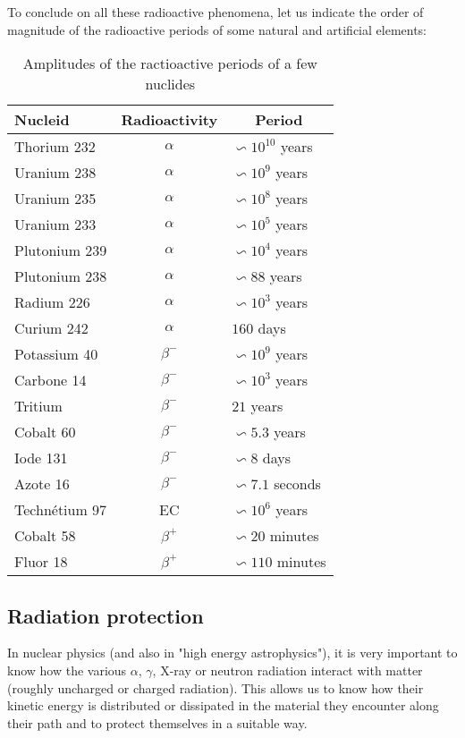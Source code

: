 	To conclude on all these radioactive phenomena, let us indicate the order of magnitude of the radioactive periods of some natural and artificial elements:
	\begin{table}[H]
		\centering
		\begin{tabular}{|l|c|l|}
		\hline
		\rowcolor[HTML]{C0C0C0} 
		\textbf{Nucleid} & \multicolumn{1}{l|}{\cellcolor[HTML]{C0C0C0}\textbf{Radioactivity}} & \multicolumn{1}{c|}{\cellcolor[HTML]{C0C0C0}\textbf{Period}} \\ \hline
		Thorium 232 & $\alpha$ & $\backsim 10^{10}$ years \\ \hline
		Uranium 238 & $\alpha$ & $\backsim 10^{9}$ years \\ \hline
		Uranium 235 & $\alpha$ & $\backsim 10^{8}$ years \\ \hline
		Uranium 233 & $\alpha$ & $\backsim 10^{5}$ years \\ \hline
		Plutonium 239 & $\alpha$ & $\backsim 10^{4}$ years \\ \hline
		Plutonium 238 & $\alpha$ & $\backsim 88$ years \\ \hline
		Radium 226 & $\alpha$ & $\backsim 10^{3}$ years \\ \hline
		Curium 242 & $\alpha$ & $160$ days \\ \hline
		Potassium 40 & $\beta^{-}$ & $\backsim 10^{9}$ years \\ \hline
		Carbone 14 & $\beta^{-}$ & $\backsim 10^{3}$ years \\ \hline
		Tritium & $\beta^{-}$ & $21$ years \\ \hline
		Cobalt 60 & $\beta^{-}$ & $\backsim 5.3$ years \\ \hline
		Iode 131 & $\beta^{-}$ & $\backsim 8$ days \\ \hline
		Azote 16 & $\beta^{-}$ & $\backsim 7.1$ seconds \\ \hline
		Technétium 97 & EC & $\backsim 10^{6}$ years \\ \hline
		Cobalt 58 & $\beta^{+}$ & $\backsim 20$ minutes \\ \hline
		Fluor 18 & $\beta^{+}$ & $\backsim 110$ minutes \\ \hline
		\end{tabular}
		\caption{Amplitudes of the ractioactive periods of a few nuclides}
	\end{table}
	
	\subsection{Radiation protection}
	In nuclear physics (and also in "high energy astrophysics"), it is very important to know how the various $\alpha$, $\gamma$, X-ray or neutron radiation interact with matter (roughly uncharged or charged radiation). This allows us to know how their kinetic energy is distributed or dissipated in the material they encounter along their path and to protect themselves in a suitable way.
	
